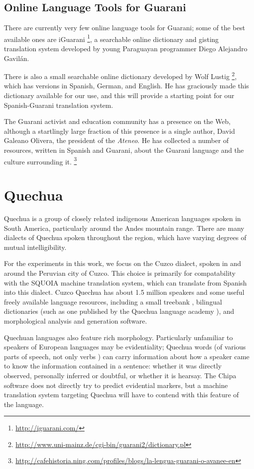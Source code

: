 \subsection{Online Language Tools for Guarani}
There are currently very few online language tools for Guarani; some of the
best available ones are iGuarani \footnote{\url{http://iguarani.com/}}, a
searchable online dictionary and gisting translation system developed by young
Paraguayan programmer Diego Alejandro Gavilán.

There is also a small searchable online dictionary developed by Wolf Lustig
\footnote{\url{http://www.uni-mainz.de/cgi-bin/guarani2/dictionary.pl}},
which has versions in Spanish, German, and English. He has graciously made this
dictionary available for our use, and this will provide a starting point for
our Spanish-Guarani translation system.

The Guarani activist and education community has a presence on the Web,
although a startlingly large fraction of this presence is a single author,
David Galeano Olivera, the president of the \emph{Ateneo}.
He has collected a number of resources, written in Spanish
and Guarani, about the Guarani language and the culture surrounding it.
\footnote{\url{http://cafehistoria.ning.com/profiles/blogs/la-lengua-guarani-o-avanee-en}}

\section{Quechua}
Quechua is a group of closely related indigenous American languages spoken in
South America, particularly around the Andes mountain range.
There are many dialects of Quechua spoken throughout the region, which have
varying degrees of mutual intelligibility.

For the experiments in this work, we focus on the Cuzco dialect, spoken in and
around the Peruvian city of Cuzco. This choice is primarily for compatability
with the SQUOIA machine translation system, which can translate from Spanish
into this dialect. Cuzco Quechua has about 1.5 million speakers and some useful
freely available language resources, including a small treebank
\cite{rios2009quechua}, bilingual dictionaries (such as one published by the
Quechua language academy \cite{academiamayor}), and morphological analysis and
generation software.

Quechuan languages also feature rich morphology. Particularly unfamiliar to
speakers of European languages may be evidentiality; Quechua words (of various
parts of speech, not only verbs \cite{coronel2002quechua}) can carry
information about how a speaker came to know the information contained in a
sentence: whether it was directly observed, personally inferred or doubtful, or
whether it is hearsay.
The Chipa software does not directly try to predict evidential markers, but a
machine translation system targeting Quechua will have to contend with this
feature of the language.
